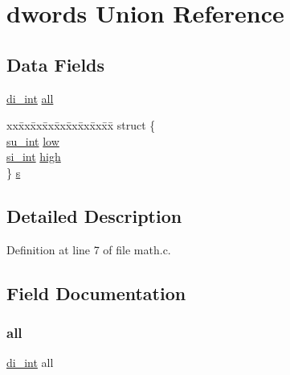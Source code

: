 \hypertarget{uniondwords}{}\section{dwords Union Reference}
\label{uniondwords}
\subsection*{Data Fields}
\begin{DoxyCompactItemize}
\item 
\hyperlink{math_8c_ac61d8e40091c07135fee5e0f6a7ca723}{di\+\_\+int} \hyperlink{uniondwords_a2e5ca25c0706f8d32bdb04664146eda4}{all}
\item 
\begin{tabbing}
xx\=xx\=xx\=xx\=xx\=xx\=xx\=xx\=xx\=\kill
struct \{\\
\>\hyperlink{math_8c_ac80f361c8037aadb06208683492f5753}{su\_int} \hyperlink{uniondwords_aa8808d04ef26a57c2797d761b736379d}{low}\\
\>\hyperlink{math_8c_a631e292730161ad5381eafff0013891e}{si\_int} \hyperlink{uniondwords_a293f90287231068768d01783f5e0418e}{high}\\
\} \hyperlink{uniondwords_a91b7cb971ea1e9b45f2e55df36121a3e}{s}\\

\end{tabbing}\end{DoxyCompactItemize}


\subsection{Detailed Description}


Definition at line 7 of file math.\+c.



\subsection{Field Documentation}
\mbox{\label{uniondwords_a2e5ca25c0706f8d32bdb04664146eda4}} 
\subsubsection{\texorpdfstring{all}{all}}
{\footnotesize\ttfamily \hyperlink{math_8c_ac61d8e40091c07135fee5e0f6a7ca723}{di\+\_\+int} all}




